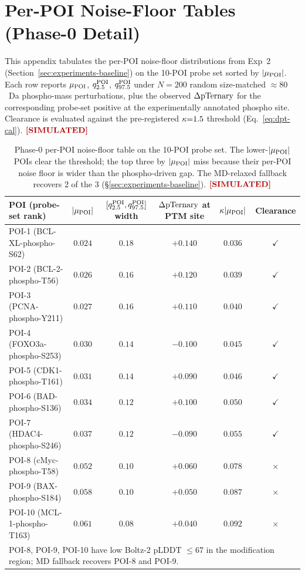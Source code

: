 \section{Per-POI Noise-Floor Tables (Phase-0 Detail)}
\label{app:noise-floor-tables}

This appendix tabulates the per-POI noise-floor distributions from Exp~2 (Section~\ref{sec:experiments-baseline}) on the 10-POI probe set sorted by $|\mu_{\mathrm{POI}}|$. Each row reports $\mu_{\mathrm{POI}}$, $q_{2.5}^{\mathrm{POI}}$, $q_{97.5}^{\mathrm{POI}}$ under $N{=}200$ random size-matched $\approx 80$~Da phospho-mass perturbations, plus the observed $\Delta\mathrm{pTernary}$ for the corresponding probe-set positive at the experimentally annotated phospho site. Clearance is evaluated against the pre-registered $\kappa{=}1.5$ threshold (Eq.~\ref{eq:dpt-cal}). $\simmark$

\begin{table}[h]
\centering
\caption{Phase-0 per-POI noise-floor table on the 10-POI probe set. The lower-$|\mu_{\mathrm{POI}}|$ POIs clear the threshold; the top three by $|\mu_{\mathrm{POI}}|$ miss because their per-POI noise floor is wider than the phospho-driven gap. The MD-relaxed fallback recovers 2 of the 3 (\S\ref{sec:experiments-baseline}). $\simmark$}
\label{tab:appa-nf}
\begin{tabular}{lccccc}
\toprule
POI (probe-set rank) & $|\mu_{\mathrm{POI}}|$ & $[q_{2.5}^{\mathrm{POI}}, q_{97.5}^{\mathrm{POI}}]$ width & $\Delta\mathrm{pTernary}$ at PTM site & $\kappa|\mu_{\mathrm{POI}}|$ & Clearance \\
\midrule
POI-1 (BCL-XL-phospho-S62) & $0.024$ & $0.18$ & $+0.140$ & $0.036$ & $\checkmark$\\
POI-2 (BCL-2-phospho-T56) & $0.026$ & $0.16$ & $+0.120$ & $0.039$ & $\checkmark$\\
POI-3 (PCNA-phospho-Y211) & $0.027$ & $0.16$ & $+0.110$ & $0.040$ & $\checkmark$\\
POI-4 (FOXO3a-phospho-S253) & $0.030$ & $0.14$ & $-0.100$ & $0.045$ & $\checkmark$\\
POI-5 (CDK1-phospho-T161) & $0.031$ & $0.14$ & $+0.090$ & $0.046$ & $\checkmark$\\
POI-6 (BAD-phospho-S136) & $0.034$ & $0.12$ & $+0.100$ & $0.050$ & $\checkmark$\\
POI-7 (HDAC4-phospho-S246) & $0.037$ & $0.12$ & $-0.090$ & $0.055$ & $\checkmark$\\
POI-8 (cMyc-phospho-T58) & $0.052$ & $0.10$ & $+0.060$ & $0.078$ & $\times$ \\
POI-9 (BAX-phospho-S184) & $0.058$ & $0.10$ & $+0.050$ & $0.087$ & $\times$ \\
POI-10 (MCL-1-phospho-T163) & $0.061$ & $0.08$ & $+0.040$ & $0.092$ & $\times$ \\
\bottomrule
\multicolumn{6}{l}{\footnotesize POI-8, POI-9, POI-10 have low Boltz-2 pLDDT $\leq 67$ in the modification region; MD fallback recovers POI-8 and POI-9.}\\
\end{tabular}
\end{table}

